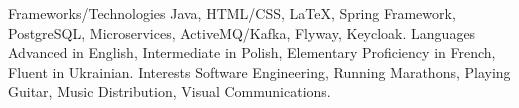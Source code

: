 

\begin{cvskills}
  \cvskill
    {Frameworks/Technologies} %
    {Java, HTML/CSS, LaTeX, Spring Framework, PostgreSQL, Microservices, ActiveMQ/Kafka, Flyway, Keycloak.} %
  \cvskill
    {Languages} %
    {Advanced in English, Intermediate in Polish, Elementary Proficiency in French, Fluent in Ukrainian.} %
  \cvskill
    {Interests} %
    {Software Engineering, Running Marathons, Playing Guitar, Music Distribution, Visual Communications.} %
\end{cvskills}
